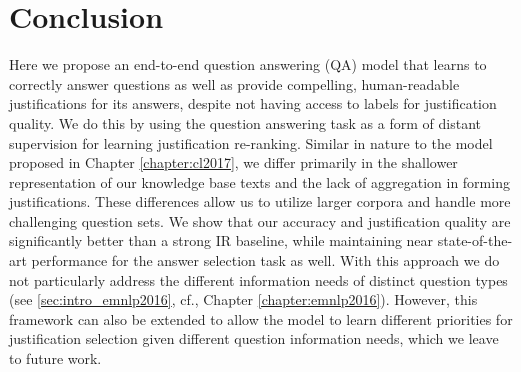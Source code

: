 \section{Conclusion}
\label{sec-emnlp2017:conclusions}

Here we propose an end-to-end question answering (QA) model that learns to correctly answer questions as well as provide compelling, human-readable justifications for its answers,  despite not having access to labels for justification quality.  We do this by using the question answering task as a form of distant supervision for learning  justification re-ranking.  Similar in nature to the model proposed in Chapter \ref{chapter:cl2017}, we differ primarily in the shallower representation of our knowledge base texts and the lack of aggregation in forming justifications.  These differences allow us to utilize larger corpora and handle more challenging question sets.   We show that our accuracy and justification quality are significantly better than a strong IR baseline, while maintaining near state-of-the-art performance for the answer selection task as well.
With this approach we do not particularly address the different information needs of distinct question types (see \ref{sec:intro_emnlp2016}, cf., Chapter \ref{chapter:emnlp2016}).  However, this framework can also be extended to allow the model to learn different priorities for justification selection given different question information needs, which we leave to future work.